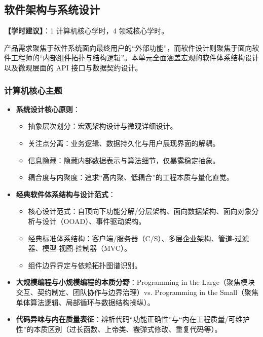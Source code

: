 \subsection{软件架构与系统设计}
\textbf{【学时建议】}：1 计算机核心学时，4 领域核心学时。

产品需求聚焦于软件系统面向最终用户的“外部功能”，而软件设计则聚焦于面向软件工程师的“内部组件拓扑与结构逻辑”。本单元全面涵盖宏观的软件体系结构设计以及微观层面的 API 接口与数据契约设计。

\subsubsection{计算机核心主题}
\begin{itemize}
    \item \textbf{系统设计核心原则}：
    \begin{itemize}
        \item 抽象层次划分：宏观架构设计与微观详细设计。
        \item 关注点分离：业务逻辑、数据持久化与用户展现界面的解耦。
        \item 信息隐藏：隐藏内部数据表示与算法细节，仅暴露稳定抽象。
        \item 耦合度与内聚度：追求“高内聚、低耦合”的工程本质与量化直觉。
    \end{itemize}
    \item \textbf{经典软件体系结构与设计范式}：
    \begin{itemize}
        \item 核心设计范式：自顶向下功能分解/分层架构、面向数据架构、面向对象分析与设计（OOAD）、事件驱动架构。
        \item 经典标准体系结构：客户端/服务器（C/S）、多层企业架构、管道-过滤器、模型-视图-控制器（MVC）。
        \item 组件边界界定与依赖拓扑图谱识别。
    \end{itemize}
    \item \textbf{大规模编程与小规模编程的本质分野}：Programming in the Large（聚焦模块交互、契约制定、团队协作与边界治理）vs. Programming in the Small（聚焦单体算法逻辑、局部循环与数据结构操纵）。
    \item \textbf{代码异味与内在质量表征}：辨析代码“功能正确性”与“内在工程质量/可维护性”的本质区别（过长函数、上帝类、霰弹式修改、重复代码等）。
\end{itemize}

